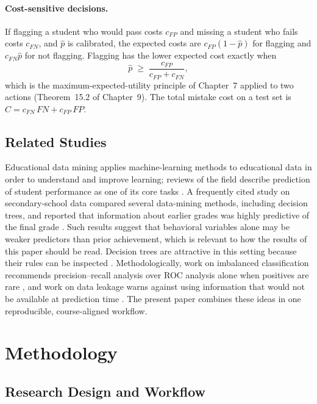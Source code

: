 \documentclass[12pt,a4paper]{article}
\theoremstyle{definition}
\begin{document}
\paragraph{Cost-sensitive decisions.} If flagging a student who would pass costs $c_{FP}$ and missing a student who fails costs $c_{FN}$, and $\hat p$ is calibrated, the expected costs are $c_{FP}(1-\hat p)$ for flagging and $c_{FN}\hat p$ for not flagging. Flagging has the lower expected cost exactly when
\begin{equation}
    \hat p \;\ge\; \frac{c_{FP}}{c_{FP}+c_{FN}}, \label{eq:costthr}
\end{equation}
which is the maximum-expected-utility principle of Chapter~7 applied to two actions (Theorem~15.2 of Chapter~9). The total mistake cost on a test set is $C = c_{FN}\,FN + c_{FP}\,FP$.

\subsection{Related Studies}

Educational data mining applies machine-learning methods to educational data in order to understand and improve learning; reviews of the field describe prediction of student performance as one of its core tasks \cite{romero2010,baker2009}. A frequently cited study on secondary-school data compared several data-mining methods, including decision trees, and reported that information about earlier grades was highly predictive of the final grade \cite{cortez2008}. Such results suggest that behavioral variables alone may be weaker predictors than prior achievement, which is relevant to how the results of this paper should be read. Decision trees are attractive in this setting because their rules can be inspected \cite{breiman1984,quinlan1986}. Methodologically, work on imbalanced classification recommends precision--recall analysis over ROC analysis alone when positives are rare \cite{saito2015}, and work on data leakage warns against using information that would not be available at prediction time \cite{kaufman2012}. The present paper combines these ideas in one reproducible, course-aligned workflow.

\section{Methodology}

\subsection{Research Design and Workflow}
\end{document}
